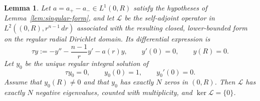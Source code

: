 \documentclass[11pt]{article}
\newtheorem{lemma}[theorem]{Lemma}
\begin{document}
\begin{lemma}\label{lem:radial-sturm}
{
Let $a=a_+-a_-\in L^1(0,R)$ satisfy the hypotheses of
Lemma~\ref{lem:singular-form}, and let $\mathcal L$ be the self-adjoint
operator in $L^2((0,R),r^{n-1}\,dr)$ associated with the resulting
closed, lower-bounded form on the regular radial Dirichlet domain. Its
differential expression is
\[
 {\tau y}:=-y''-\frac{n-1}{r}y'-a(r)y,
 \qquad y'(0)=0,
 \qquad y(R)=0.
\]
Let $y_0$ be the unique regular integral solution of
\begin{equation*}
 {\tau y_0=0},
 \qquad y_0(0)=1,
 \qquad y_0'(0)=0.
\end{equation*}
Assume that $y_0(R)\ne0$ and that $y_0$ has exactly $N$ zeros in
$(0,R)$.  Then $\mathcal L$ has exactly $N$ negative eigenvalues,
counted with multiplicity, and $\ker\mathcal L=\{0\}$.
}
\end{lemma}
\end{document}
